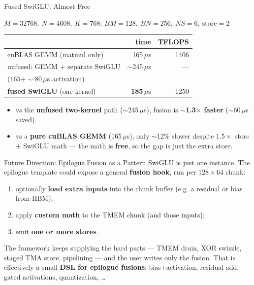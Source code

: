\documentclass[aspectratio=169,professionalfonts]{beamer}
\begin{document}
\begin{frame}{Fused SwiGLU: Almost Free}
  \begin{center}\small
    $M{=}32768,\ N{=}4608,\ K{=}768$; \quad $BM{=}128,\ BN{=}256,\ NS{=}6,\
    \text{store}{=}2$
  \end{center}

  \vspace{0.15cm}
  \begin{center}\small
    \begin{tabular}{lrr}
      \toprule
       & time & TFLOPS \\
      \midrule
      cuBLAS GEMM (matmul only)              & 165\,$\mu$s & 1406 \\
      unfused: GEMM $+$ separate SwiGLU      & $\sim$245\,$\mu$s & --- \\
      \quad\scriptsize ($165 + {\sim}80$\,$\mu$s activation) & & \\
      \textbf{fused SwiGLU} (one kernel)     & \textbf{185}\,$\mu$s & 1250 \\
      \bottomrule
    \end{tabular}
  \end{center}

  \vspace{0.2cm}
  \begin{itemize}
    \item vs the \textbf{unfused two-kernel} path ($\sim$245\,$\mu$s), fusion is
      \textbf{$\sim$1.3$\times$ faster} ($\sim$60\,$\mu$s saved).
    \item vs a \textbf{pure cuBLAS GEMM} (165\,$\mu$s), only $\sim$12\% slower
      despite $1.5\times$ store $+$ SwiGLU math --- the math is \textbf{free}, so
      the gap is just the extra store.
  \end{itemize}
\end{frame}

\begin{frame}{Future Direction: Epilogue Fusion as a Pattern}
  SwiGLU is just one instance. The epilogue template could expose a general
  \textbf{fusion hook}, run per $128\times64$ chunk:

  \vspace{0.15cm}
  \begin{enumerate}
    \item optionally \textbf{load extra inputs} into the chunk buffer (e.g. a
      residual or bias from HBM);
    \item apply \textbf{custom math} to the TMEM chunk (and those inputs);
    \item emit \textbf{one or more stores}.
  \end{enumerate}

  \vspace{0.25cm}
  The framework keeps supplying the hard parts --- TMEM drain, XOR swizzle,
  staged TMA store, pipelining --- and the user writes only the fusion. That is
  effectively a small \textbf{DSL for epilogue fusions}: bias$+$activation,
  residual add, gated activations, quantization, \ldots
\end{frame}
\end{document}
